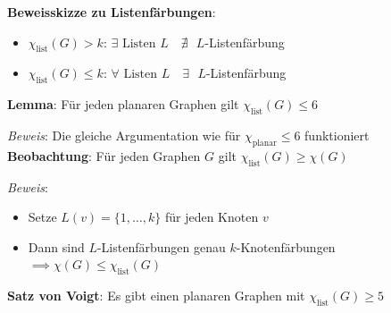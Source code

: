\bigskip
\textbf{Beweisskizze zu Listenfärbungen}: 
\begin{itemize}
	\item $\chi_{\text{list}}(G)>k$: $\exists \text{ Listen } L\quad \nexists\text{ } L$-Listenfärbung 
	\item $\chi_{\text{list}}(G)\leq k$: $\forall \text{ Listen } L\quad \exists\text{ } L$-Listenfärbung
\end{itemize}
\bigskip
\textbf{Lemma}: Für jeden planaren Graphen gilt $\chi_{\text{list}}(G)\leq 6$

\textit{Beweis}: Die gleiche Argumentation wie für $\chi_{\text{planar}}\leq 6$ funktioniert\\

\textbf{Beobachtung}: Für jeden Graphen $G$ gilt $\chi_{\text{list}}(G)\geq \chi(G)$

\textit{Beweis}: 
\begin{itemize}
	\item Setze $L(v)=\{1,\ldots,k\}$ für jeden Knoten $v$
	\item Dann sind $L$-Listenfärbungen genau $k$-Knotenfärbungen $\implies \chi(G)\leq \chi_{\text{list}}(G)$
\end{itemize}
\bigskip
\textbf{Satz von Voigt}: Es gibt einen planaren Graphen mit $\chi_{\text{list}}(G)\geq 5$

